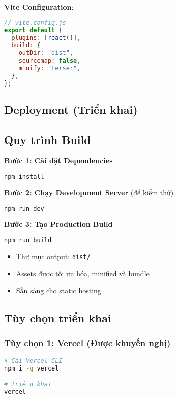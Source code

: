 \textbf{Vite Configuration}:

\begin{lstlisting}[language=JavaScript, caption=Cấu hình Vite]
// vite.config.js
export default {
  plugins: [react()],
  build: {
    outDir: "dist",
    sourcemap: false,
    minify: "terser",
  },
};
\end{lstlisting}

\subsection{Deployment (Triển khai)}

\subsection{Quy trình Build}

\textbf{Bước 1: Cài đặt Dependencies}
\begin{lstlisting}[language=bash]
npm install
\end{lstlisting}

\textbf{Bước 2: Chạy Development Server} (để kiểm thử)
\begin{lstlisting}[language=bash]
npm run dev
\end{lstlisting}

\textbf{Bước 3: Tạo Production Build}
\begin{lstlisting}[language=bash]
npm run build
\end{lstlisting}

\begin{itemize}
    \item Thư mục output: \texttt{dist/}
    \item Assets được tối ưu hóa, minified và bundle
    \item Sẵn sàng cho static hosting
\end{itemize}

\subsection{Tùy chọn triển khai}

\subsubsection{Tùy chọn 1: Vercel (Được khuyến nghị)}

\begin{lstlisting}[language=bash]
# Cài Vercel CLI
npm i -g vercel

# Triển khai
vercel
\end{lstlisting}

